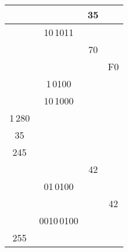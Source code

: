 \documentclass[12pt]{article}
\begin{document}
\begin{table}[h]
\begin{tabular}{ | c | c | c | c | }
        \hline
        & & 35 & \\
        \hline
        & 10\,1011 & & \\
        \hline
        & & 70 & \\
        \hline
        & & & F0 \\
        \hline
        & 1\,0100 & & \\
        \hline
        & 10\,1000 & & \\
        \hline
        1\,280 & & & \\
        \hline
        35 & & & \\
        \hline
        245 & & & \\
        \hline
        & & 42 & \\
        \hline
        & 01\,0100 & & \\
        \hline
        & & & 42 \\
        \hline
        & 0010\,0100 & & \\
        \hline
        255 & & & \\
        \hline
    \end{tabular}

\end{table}
\end{document}
